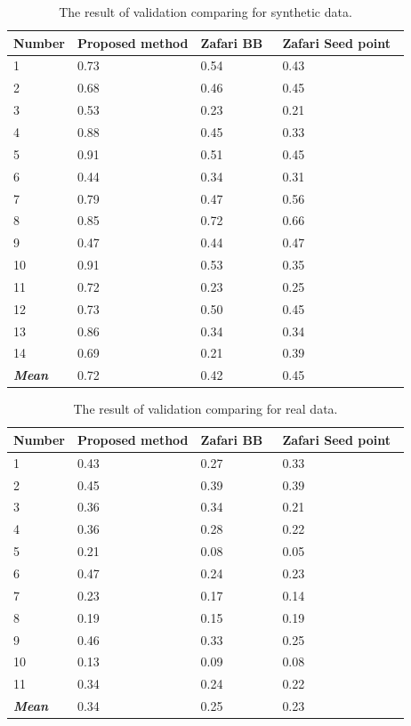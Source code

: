\documentclass{lutmscthesis}[2010/09/22]
\begin{document}
\begin{table}[hpt]
\begin{center}
\caption{The result of validation comparing for synthetic data.\label{tab:syndata}}
\begin{tabular}{ |p{2cm}||p{3cm}|p{3cm}|p{4cm}|  }
 \hline
 Number & Proposed method & Zafari BB~\cite{zafari-bb} &Zafari Seed point~\cite{Zafari15}\\
 \hline
 1   &  0.73&  0.54& 0.43\\
 2   &  0.68&  0.46& 0.45\\
 3   &  0.53&  0.23& 0.21\\
 4   &  0.88&  0.45& 0.33\\
 5   &  0.91&  0.51& 0.45\\
 6   &  0.44&  0.34& 0.31\\
 7   &  0.79&  0.47& 0.56\\
 8   &  0.85&  0.72& 0.66\\
 9   &  0.47&  0.44& 0.47\\
 10   &  0.91&  0.53& 0.35\\
 11  &  0.72&  0.23& 0.25\\
 12   &  0.73&  0.50& 0.45\\
 13   &  0.86&  0.34& 0.34\\
 14   &  0.69&  0.21& 0.39\\
 \hline
 \textbf{\textit{Mean}} & 0.72 & 0.42 & 0.45\\
 \hline
\end{tabular}
\end{center}
\end{table}


\begin{table}[hpt]
\begin{center}
\caption{The result of validation comparing for real data.\label{tab:realdata}}
\begin{tabular}{ |p{2cm}||p{3cm}|p{3cm}|p{4cm}|  }
 \hline
 Number & Proposed method & Zafari BB~\cite{zafari-bb} &Zafari Seed point~\cite{Zafari15}\\
 \hline
 1   &  0.43&  0.27& 0.33\\
 2   &  0.45&  0.39& 0.39\\
 3   &  0.36&  0.34& 0.21\\
 4   &  0.36&  0.28& 0.22\\
 5   &  0.21&  0.08& 0.05\\
 6   &  0.47&  0.24& 0.23\\
 7   &  0.23&  0.17& 0.14\\
 8   &  0.19&  0.15& 0.19\\
 9   &  0.46&  0.33& 0.25\\
 10   &  0.13&  0.09& 0.08\\
 11  &  0.34&  0.24& 0.22\\
 \hline
 \textbf{\textit{Mean}} & 0.34 & 0.25 & 0.23\\
 \hline
\end{tabular}
\end{center}
\end{table}
\end{document}
